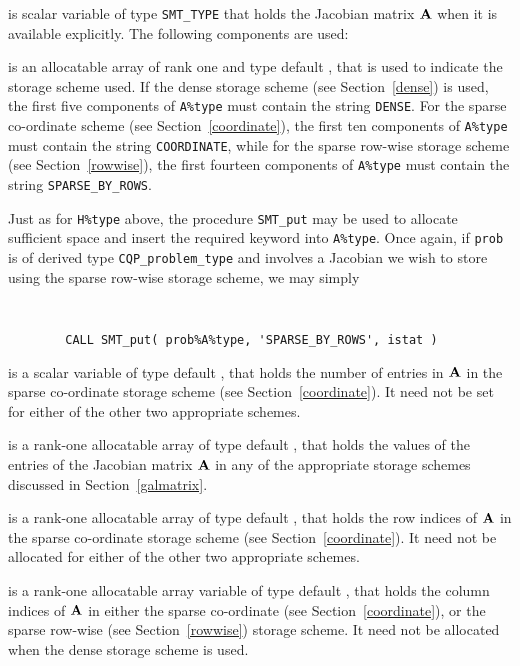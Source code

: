 \documentclass{galahad}
\newcommand{\packagename}{CQP}
\begin{document}
\begin{description}
 is scalar variable of type {\tt SMT\_TYPE}
that holds the Jacobian matrix ${\mathbf{A}}$ when it is available explicitly.
The following components are used:

\begin{description}

 is an allocatable array of rank one and type default \character,
that is used to indicate the storage scheme used. If the dense storage scheme
(see Section~\ref{dense}) is used,
the first five components of {\tt A\%type} must contain the
string {\tt DENSE}.
For the sparse co-ordinate scheme (see Section~\ref{coordinate}),
the first ten components of {\tt A\%type} must contain the
string {\tt COORDINATE}, while
for the sparse row-wise storage scheme (see Section~\ref{rowwise}),
the first fourteen components of {\tt A\%type} must contain the
string {\tt SPARSE\_BY\_ROWS}.

Just as for {\tt H\%type} above, the procedure {\tt SMT\_put}
may be used to allocate sufficient space and insert the required keyword
into {\tt A\%type}.
Once again, if {\tt prob} is of derived type {\tt \packagename\_problem\_type}
and involves a Jacobian we wish to store using the sparse row-wise
storage scheme, we may simply
{\tt
\begin{verbatim}
        CALL SMT_put( prob%A%type, 'SPARSE_BY_ROWS', istat )
\end{verbatim}
}
\noindent

 is a scalar variable of type default \integer, that
holds the number of entries in ${\mathbf{A}}$
in the sparse co-ordinate storage scheme (see Section~\ref{coordinate}).
It need not be set for either of the other two appropriate schemes.

 is a rank-one allocatable array of type default \realdp, that holds
the values of the entries of the Jacobian matrix ${\mathbf{A}}$ in any of the
appropriate storage schemes discussed in Section~\ref{galmatrix}.

 is a rank-one allocatable array of type default \integer,
that holds the row indices of ${\mathbf{A}}$ in the sparse co-ordinate storage
scheme (see Section~\ref{coordinate}).
It need not be allocated for either of the other two appropriate schemes.

 is a rank-one allocatable array variable of type default \integer,
that holds the column indices of ${\mathbf{A}}$ in either the sparse co-ordinate
(see Section~\ref{coordinate}), or the sparse row-wise
(see Section~\ref{rowwise}) storage scheme.
It need not be allocated when the dense storage scheme is used.


\end{description}
\end{description}
\end{document}
